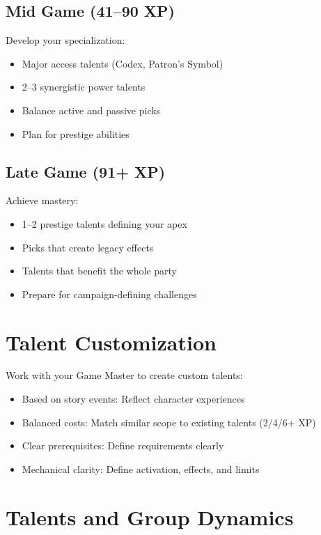 \documentclass[11pt,twoside,openany]{book}
\begin{document}
\subsection*{Mid Game (41–90 XP)}

Develop your specialization:
\begin{itemize}
\item Major access talents (Codex, Patron's Symbol)
\item 2–3 synergistic power talents
\item Balance active and passive picks
\item Plan for prestige abilities
\end{itemize}

\subsection*{Late Game (91+ XP)}

Achieve mastery:
\begin{itemize}
\item 1–2 prestige talents defining your apex
\item Picks that create legacy effects
\item Talents that benefit the whole party
\item Prepare for campaign-defining challenges
\end{itemize}

\section*{Talent Customization} 

Work with your Game Master to create custom talents:
\begin{itemize}
\item Based on story events: Reflect character experiences
\item Balanced costs: Match similar scope to existing talents (2/4/6+ XP)
\item Clear prerequisites: Define requirements clearly
\item Mechanical clarity: Define activation, effects, and limits
\end{itemize}

\section*{Talents and Group Dynamics} 
\end{document}

